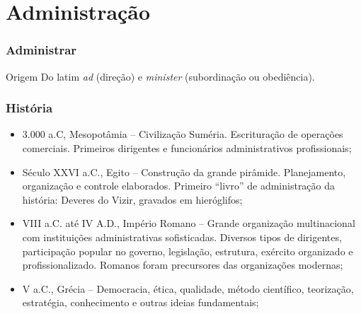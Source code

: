 \documentclass[aspectratio=169]{beamer}
\begin{document}

\section{Administra\c cão}

\begin{frame}
	\frametitle{Administrar}

	\begin{block}{Origem}
	 Do latim \textit{ad} (dire\c cão) e \textit{minister} (subordina\c cão ou obediência).
	\end{block}
\end{frame}

\begin{frame}
	\frametitle{História}

	\begin{itemize}
		\item 3.000 a.C, Mesopotâmia -- Civiliza\c cão Suméria. Escritura\c cão de opera\c cões comerciais. Primeiros dirigentes e funcionários administrativos profissionais; 
		\item Século XXVI a.C., Egito -- Constru\c cão da grande pirâmide. Planejamento, organiza\c cão e controle elaborados. Primeiro ``livro'' de administra\c cão da história: Deveres do Vizir, gravados em hieróglifos;
		\item VIII a.C. até IV A.D., Império Romano -- Grande organiza\c cão multinacional com institui\c cões administrativas sofisticadas. Diversos tipos de dirigentes, participa\c cão popular no governo, legisla\c cão, estrutura, exército organizado e profissionalizado. Romanos foram precursores das organiza\c cões modernas;
		\item V a.C., Grécia -- Democracia, ética, qualidade, método científico, teoriza\c cão, estratégia, conhecimento e outras ideias fundamentais;
	\end{itemize}
\end{frame}
\end{document}
